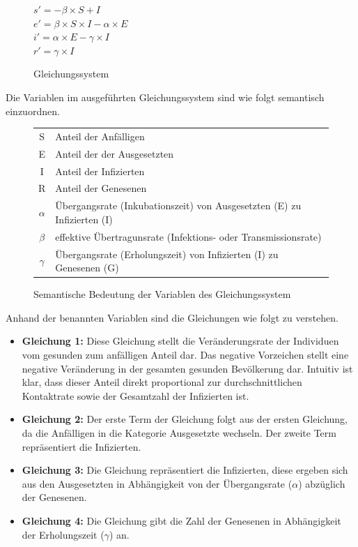 \documentclass[12pt]{article}
\begin{document}
\begin{figure}[H]
\centering
{
    $s' = -\beta \times S + I$ \\
    $e' = \beta \times S \times I - \alpha \times E$ \\
    $i' = \alpha \times E - \gamma \times I$ \\
    $r' = \gamma \times I$ \\
}
\caption{Gleichungssystem}
\label{fig:Gleichungssystem}
\end{figure}

Die Variablen im ausgeführten Gleichungssystem sind wie folgt semantisch einzuordnen.

\begin{figure}[H]
\centering
\begin{tabular}{ | c | l | }
\hline
 S        & Anteil der Anfälligen \\ 
 E        & Anteil der  der Ausgesetzten \\  
 I        & Anteil der Infizierten \\
 R        & Anteil der Genesenen \\
 $\alpha$ & Übergangsrate (Inkubationszeit) von Ausgesetzten (E) zu Infizierten (I) \\
 $\beta$  & effektive Übertragunsrate (Infektions- oder Transmissionsrate)  \\
 $\gamma$ & Übergangsrate (Erholungszeit) von Infizierten (I) zu Genesenen (G)  \\
\hline
\end{tabular}
\caption{Semantische Bedeutung der Variablen des Gleichungssystem}
\label{fig:SemantikVariablen}
\end{figure}

Anhand der benannten Variablen sind die Gleichungen wie folgt zu verstehen.

\begin{itemize}
    \item \textbf{Gleichung 1:} Diese Gleichung stellt die Veränderungsrate der Individuen vom gesunden zum anfälligen Anteil dar. Das negative Vorzeichen stellt eine negative Veränderung in der gesamten gesunden Bevölkerung dar. Intuitiv ist klar, dass dieser Anteil direkt proportional zur durchschnittlichen Kontaktrate sowie der Gesamtzahl der Infizierten ist.
    \item \textbf{Gleichung 2:} Der erste Term der Gleichung folgt aus der ersten Gleichung, da die Anfälligen in die Kategorie Ausgesetzte wechseln. Der zweite Term repräsentiert die Infizierten.
    \item \textbf{Gleichung 3:} Die Gleichung repräsentiert die Infizierten, diese ergeben sich aus den Ausgesetzten in Abhängigkeit von der Übergangsrate ($\alpha$) abzüglich der Genesenen.
    \item \textbf{Gleichung 4:} Die Gleichung gibt die Zahl der Genesenen in Abhängigkeit der Erholungszeit ($\gamma$) an.
\end{itemize}
\end{document}
